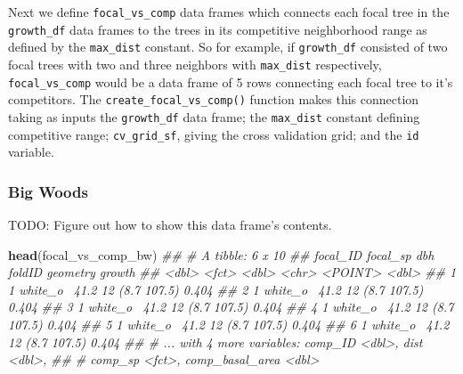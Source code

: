 \documentclass[12pt]{article}
\newenvironment{Shaded}{\begin{snugshade}}{\end{snugshade}}
\newcommand{\CommentTok}[1]{\textcolor[rgb]{0.56,0.35,0.01}{\textit{#1}}}
\newcommand{\DataTypeTok}[1]{\textcolor[rgb]{0.13,0.29,0.53}{#1}}
\newcommand{\KeywordTok}[1]{\textcolor[rgb]{0.13,0.29,0.53}{\textbf{#1}}}
\newcommand{\NormalTok}[1]{#1}
\newcommand{\OperatorTok}[1]{\textcolor[rgb]{0.81,0.36,0.00}{\textbf{#1}}}
\newcommand{\StringTok}[1]{\textcolor[rgb]{0.31,0.60,0.02}{#1}}
\begin{document}
Next we define \texttt{focal\_vs\_comp} data frames which connects each
focal tree in the \texttt{growth\_df} data frames to the trees in its
competitive neighborhood range as defined by the \texttt{max\_dist}
constant. So for example, if \texttt{growth\_df} consisted of two focal
trees with two and three neighbors with \texttt{max\_dist} respectively,
\texttt{focal\_vs\_comp} would be a data frame of 5 rows connecting each
focal tree to it's competitors. The \texttt{create\_focal\_vs\_comp()}
function makes this connection taking as inputs the \texttt{growth\_df}
data frame; the \texttt{max\_dist} constant defining competitive range;
\texttt{cv\_grid\_sf}, giving the cross validation grid; and the
\texttt{id} variable.

\hypertarget{big-woods-3}{%
\subsubsection{Big Woods}\label{big-woods-3}}

\begin{Shaded}
\end{Shaded}

TODO: Figure out how to show this data frame's contents.

\begin{Shaded}
\begin{Highlighting}[]
\KeywordTok{head}\NormalTok{(focal_vs_comp_bw)}
\CommentTok{## # A tibble: 6 x 10}
\CommentTok{##   focal_ID focal_sp   dbh foldID                  geometry growth}
\CommentTok{##      <dbl> <fct>    <dbl> <chr>                    <POINT>  <dbl>}
\CommentTok{## 1        1 white_o~  41.2 12                   (8.7 107.5)  0.404}
\CommentTok{## 2        1 white_o~  41.2 12                   (8.7 107.5)  0.404}
\CommentTok{## 3        1 white_o~  41.2 12                   (8.7 107.5)  0.404}
\CommentTok{## 4        1 white_o~  41.2 12                   (8.7 107.5)  0.404}
\CommentTok{## 5        1 white_o~  41.2 12                   (8.7 107.5)  0.404}
\CommentTok{## 6        1 white_o~  41.2 12                   (8.7 107.5)  0.404}
\CommentTok{## # ... with 4 more variables: comp_ID <dbl>, dist <dbl>,}
\CommentTok{## #   comp_sp <fct>, comp_basal_area <dbl>}
\end{Highlighting}
\end{Shaded}
\end{document}
